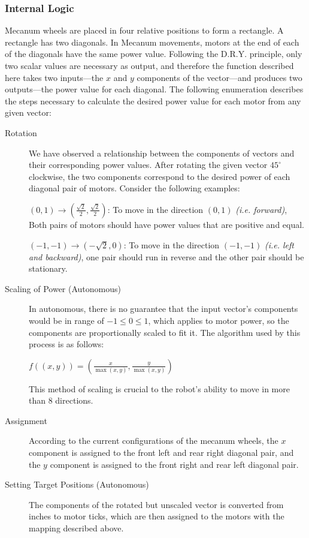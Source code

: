 \documentclass[letterpaper]{article}
\begin{document}
\subsubsection{Internal Logic}
Mecanum wheels are placed in four relative positions to form a rectangle. A rectangle has two diagonals. In Mecanum movements, motors at the end of each of the diagonals have the same power value. Following the D.R.Y. principle, only two scalar values are necessary as output, and therefore the function described here takes two inputs---the $x$ and $y$ components of the vector---and produces two outputs---the power value for each diagonal. The following enumeration describes the steps necessary to calculate the desired power value for each motor from any given vector:
\begin{description}
	\item[Rotation]
	We have observed a relationship between the components of vectors and their corresponding power values. After rotating the given vector $45^\circ$ clockwise, the two components correspond to the desired power of each diagonal pair of motors. Consider the following examples:
\begin{center}
	$(0, 1) \rightarrow (\frac{\sqrt{2}}{2}, \frac{\sqrt{2}}{2})$: To move in the direction $(0, 1)$ \textit{(i.e. forward)}, Both pairs of motors should have power values that are positive and equal.
	
	$(-1, -1) \rightarrow (-\sqrt{2},0)$: To move in the direction $(-1, -1)$ \textit{(i.e. left and backward)}, one pair should run in reverse and the other pair should be stationary.
\end{center}
	\item[Scaling of Power (Autonomous)]
	In autonomous, there is no guarantee that the input vector's components would be in range of $-1 \leq 0 \leq 1$, which applies to motor power, so the components are proportionally scaled to fit it. The algorithm used by this process is as follows:
	\begin{center}
		$f((x, y)) = (\frac{x}{\max(x, y)}, \frac{y}{\max(x, y)})$
	\end{center}
	This method of scaling is crucial to the robot's ability to move in more than 8 directions.
	
	\item[Assignment]
	According to the current configurations of the mecanum wheels, the $x$ component is assigned to the front left and rear right diagonal pair, and the $y$ component is assigned to the front right and rear left diagonal pair.
	
	\item[Setting Target Positions (Autonomous)]
	The components of the rotated but unscaled vector is converted from inches to motor ticks, which are then assigned to the motors with the mapping described above.
\end{description}
\end{document}
